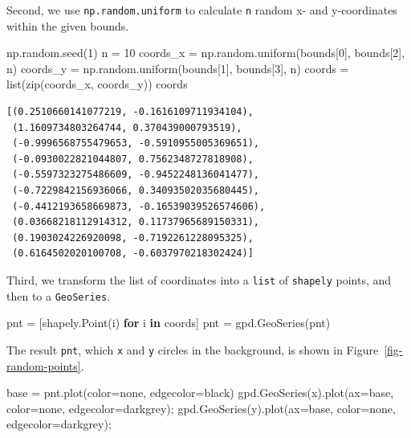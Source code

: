 \documentclass[
  letterpaper,
]{krantz}
\newenvironment{Shaded}{\begin{snugshade}}{\end{snugshade}}
\newcommand{\BuiltInTok}[1]{\textcolor[rgb]{0.00,0.23,0.31}{#1}}
\newcommand{\ControlFlowTok}[1]{\textcolor[rgb]{0.00,0.23,0.31}{\textbf{#1}}}
\newcommand{\DecValTok}[1]{\textcolor[rgb]{0.68,0.00,0.00}{#1}}
\newcommand{\KeywordTok}[1]{\textcolor[rgb]{0.00,0.23,0.31}{\textbf{#1}}}
\newcommand{\NormalTok}[1]{\textcolor[rgb]{0.00,0.23,0.31}{#1}}
\newcommand{\OperatorTok}[1]{\textcolor[rgb]{0.37,0.37,0.37}{#1}}
\newcommand{\StringTok}[1]{\textcolor[rgb]{0.13,0.47,0.30}{#1}}
\begin{document}
Second, we use \texttt{np.random.uniform} to calculate \texttt{n} random
x- and y-coordinates within the given bounds.

\begin{Shaded}
\begin{Highlighting}[]
\NormalTok{np.random.seed(}\DecValTok{1}\NormalTok{)}
\NormalTok{n }\OperatorTok{=} \DecValTok{10}
\NormalTok{coords\_x }\OperatorTok{=}\NormalTok{ np.random.uniform(bounds[}\DecValTok{0}\NormalTok{], bounds[}\DecValTok{2}\NormalTok{], n)}
\NormalTok{coords\_y }\OperatorTok{=}\NormalTok{ np.random.uniform(bounds[}\DecValTok{1}\NormalTok{], bounds[}\DecValTok{3}\NormalTok{], n)}
\NormalTok{coords }\OperatorTok{=} \BuiltInTok{list}\NormalTok{(}\BuiltInTok{zip}\NormalTok{(coords\_x, coords\_y))}
\NormalTok{coords}
\end{Highlighting}
\end{Shaded}

\begin{verbatim}
[(0.2510660141077219, -0.1616109711934104),
 (1.1609734803264744, 0.370439000793519),
 (-0.9996568755479653, -0.5910955005369651),
 (-0.0930022821044807, 0.7562348727818908),
 (-0.5597323275486609, -0.9452248136041477),
 (-0.7229842156936066, 0.34093502035680445),
 (-0.4412193658669873, -0.16539039526574606),
 (0.03668218112914312, 0.11737965689150331),
 (0.1903024226920098, -0.7192261228095325),
 (0.6164502020100708, -0.6037970218302424)]
\end{verbatim}

Third, we transform the list of coordinates into a \texttt{list} of
\texttt{shapely} points, and then to a \texttt{GeoSeries}.

\begin{Shaded}
\begin{Highlighting}[]
\NormalTok{pnt }\OperatorTok{=}\NormalTok{ [shapely.Point(i) }\ControlFlowTok{for}\NormalTok{ i }\KeywordTok{in}\NormalTok{ coords]}
\NormalTok{pnt }\OperatorTok{=}\NormalTok{ gpd.GeoSeries(pnt)}
\end{Highlighting}
\end{Shaded}

The result \texttt{pnt}, which \texttt{x} and \texttt{y} circles in the
background, is shown in Figure~\ref{fig-random-points}.

\begin{Shaded}
\begin{Highlighting}[]
\NormalTok{base }\OperatorTok{=}\NormalTok{ pnt.plot(color}\OperatorTok{=}\StringTok{\textquotesingle{}none\textquotesingle{}}\NormalTok{, edgecolor}\OperatorTok{=}\StringTok{\textquotesingle{}black\textquotesingle{}}\NormalTok{)}
\NormalTok{gpd.GeoSeries(x).plot(ax}\OperatorTok{=}\NormalTok{base, color}\OperatorTok{=}\StringTok{\textquotesingle{}none\textquotesingle{}}\NormalTok{, edgecolor}\OperatorTok{=}\StringTok{\textquotesingle{}darkgrey\textquotesingle{}}\NormalTok{)}\OperatorTok{;}
\NormalTok{gpd.GeoSeries(y).plot(ax}\OperatorTok{=}\NormalTok{base, color}\OperatorTok{=}\StringTok{\textquotesingle{}none\textquotesingle{}}\NormalTok{, edgecolor}\OperatorTok{=}\StringTok{\textquotesingle{}darkgrey\textquotesingle{}}\NormalTok{)}\OperatorTok{;}
\end{Highlighting}
\end{Shaded}
\end{document}
